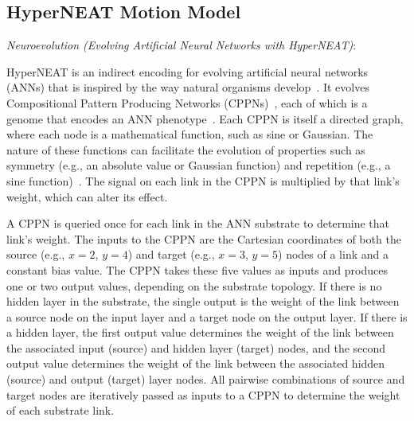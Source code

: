 \subsection{HyperNEAT Motion Model}

\emph{Neuroevolution (Evolving Artificial Neural Networks with HyperNEAT)}: 
    
HyperNEAT is an indirect encoding for evolving artificial neural
networks (ANNs) that is inspired by the way natural organisms
develop~\cite{stanley2009hypercube}. It evolves Compositional Pattern
Producing Networks (CPPNs)~\cite{stanley2007compositional}, each of
which is a genome that encodes an ANN
phenotype~\cite{stanley2009hypercube}. Each CPPN is itself a directed
graph, where each node is a mathematical function, such as sine or
Gaussian. The nature of these functions can facilitate the evolution
of properties such as symmetry (e.g., an absolute value or Gaussian
function) and repetition (e.g., a sine
function)~\cite{stanley2009hypercube, stanley2007compositional}. The
signal on each link in the CPPN is multiplied by that link's weight,
which can alter its effect.
  
A CPPN is queried once for each link in the ANN substrate to determine
that link's weight. The inputs to the CPPN are the Cartesian
coordinates of both the source (e.g., $x = 2$, $y = 4$) and target
(e.g., $x = 3$, $y = 5$) nodes of a link and a constant bias
value. The CPPN takes these five values as inputs and produces one or
two output values, depending on the substrate topology. If there is no
hidden layer in the substrate, the single output is the weight of the
link between a source node on the input layer and a target node on the
output layer. If there is a hidden layer, the first output value
determines the weight of the link between the associated input
(source) and hidden layer (target) nodes, and the second output value
determines the weight of the link between the associated hidden
(source) and output (target) layer nodes. All pairwise combinations of
source and target nodes are iteratively passed as inputs to a CPPN to
determine the weight of each substrate link.


